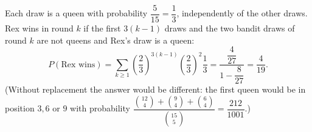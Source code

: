 Each draw is a queen with probability $\dfrac{5}{15}=\dfrac{1}{3}$, independently of the other draws. Rex wins in round $k$ if the first $3(k-1)$ draws and the two bandit draws of round $k$ are not queens and Rex's draw is a queen:
\[
P(\text{Rex wins})=\sum_{k\ge1}\left(\dfrac{2}{3}\right)^{3(k-1)}\left(\dfrac{2}{3}\right)^{2}\dfrac{1}{3}
=\dfrac{\dfrac{4}{27}}{1-\dfrac{8}{27}}=\boxed{\dfrac{4}{19}} .
\]
(Without replacement the answer would be different: the first queen would be in position $3,6$ or $9$ with probability $\dfrac{\binom{12}{4}+\binom94+\binom64}{\binom{15}{5}}=\dfrac{212}{1001}$.)
